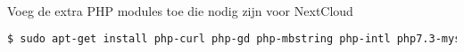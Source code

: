 Voeg de extra PHP modules toe die nodig zijn voor NextCloud
\begin{lstlisting}[language=bash]
$ sudo apt-get install php-curl php-gd php-mbstring php-intl php7.3-mysql php7.3-xml php-zip php-bz2
\end{lstlisting}
